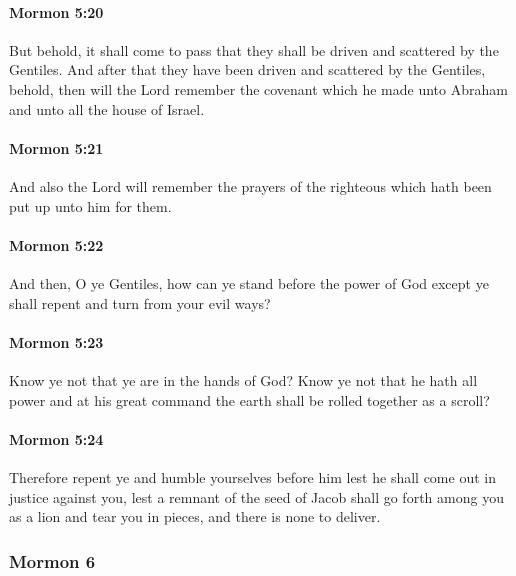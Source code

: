 		\paragraph{Mormon 5:20} %
			\label{MORMON-5-20}

			But behold, it shall come to pass
			that they shall be driven and scattered by the Gentiles.
			And after that they have been driven and scattered by the Gentiles,
			behold, then will the Lord remember the covenant
			which he made unto Abraham and unto all the house of Israel.

		\paragraph{Mormon 5:21} %
			\label{MORMON-5-21}

			And also the Lord will remember the prayers of the righteous
			which hath been put up unto him for them.

		\paragraph{Mormon 5:22} %
			\label{MORMON-5-22}

			And then, O ye Gentiles, how can ye stand before the power of God
			except ye shall repent and turn from your evil ways?

		\paragraph{Mormon 5:23} %
			\label{MORMON-5-23}

			Know ye not that ye are in the hands of God?
			Know ye not that he hath all power
			and at his great command the earth shall be rolled together as a scroll?

		\paragraph{Mormon 5:24} %
			\label{MORMON-5-24}

			Therefore repent ye and humble yourselves before him
			lest he shall come out in justice against you,
			lest a remnant of the seed of Jacob shall go forth among you as a lion
			and tear you in pieces,
			and there is none to deliver.

	\subsubsection{Mormon 6} %
		\label{MORMON-6}
		
